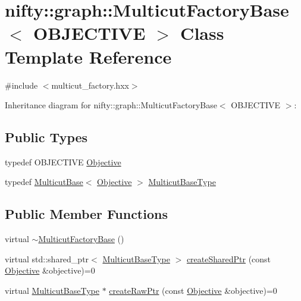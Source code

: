 \hypertarget{classnifty_1_1graph_1_1MulticutFactoryBase}{}\section{nifty\+:\+:graph\+:\+:Multicut\+Factory\+Base$<$ O\+B\+J\+E\+C\+T\+I\+V\+E $>$ Class Template Reference}
\label{classnifty_1_1graph_1_1MulticutFactoryBase}


{\ttfamily \#include $<$multicut\+\_\+factory.\+hxx$>$}



Inheritance diagram for nifty\+:\+:graph\+:\+:Multicut\+Factory\+Base$<$ O\+B\+J\+E\+C\+T\+I\+V\+E $>$\+:
\subsection*{Public Types}
\begin{DoxyCompactItemize}
\item 
typedef O\+B\+J\+E\+C\+T\+I\+V\+E \hyperlink{classnifty_1_1graph_1_1MulticutFactoryBase_a4c305b0d8842e47659998480de5ffcc5}{Objective}
\item 
typedef \hyperlink{classnifty_1_1graph_1_1MulticutBase}{Multicut\+Base}$<$ \hyperlink{classnifty_1_1graph_1_1MulticutFactoryBase_a4c305b0d8842e47659998480de5ffcc5}{Objective} $>$ \hyperlink{classnifty_1_1graph_1_1MulticutFactoryBase_a301de1603477785a351914c2bbcf8164}{Multicut\+Base\+Type}
\end{DoxyCompactItemize}
\subsection*{Public Member Functions}
\begin{DoxyCompactItemize}
\item 
virtual \hyperlink{classnifty_1_1graph_1_1MulticutFactoryBase_a4260b54dfe8c7b54ebb0a3c86f22212e}{$\sim$\+Multicut\+Factory\+Base} ()
\item 
virtual std\+::shared\+\_\+ptr$<$ \hyperlink{classnifty_1_1graph_1_1MulticutFactoryBase_a301de1603477785a351914c2bbcf8164}{Multicut\+Base\+Type} $>$ \hyperlink{classnifty_1_1graph_1_1MulticutFactoryBase_a88ce157b01232b3655b094dc5f543a34}{create\+Shared\+Ptr} (const \hyperlink{classnifty_1_1graph_1_1MulticutFactoryBase_a4c305b0d8842e47659998480de5ffcc5}{Objective} \&objective)=0
\item 
virtual \hyperlink{classnifty_1_1graph_1_1MulticutFactoryBase_a301de1603477785a351914c2bbcf8164}{Multicut\+Base\+Type} $\ast$ \hyperlink{classnifty_1_1graph_1_1MulticutFactoryBase_aee02ba4451f6dbd02f3c16486b1be1a8}{create\+Raw\+Ptr} (const \hyperlink{classnifty_1_1graph_1_1MulticutFactoryBase_a4c305b0d8842e47659998480de5ffcc5}{Objective} \&objective)=0
\end{DoxyCompactItemize}


